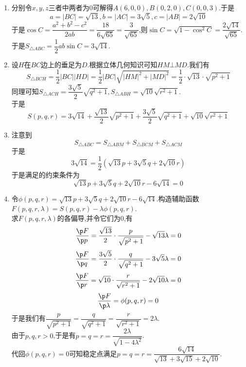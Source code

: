\documentclass{ctexart}
\begin{document}
\begin{solution}
    \begin{enumerate}[label=\textbf{(\arabic*)},leftmargin=*]
        \item 分别令$x,y,z$三者中两者为$0$可解得$A(6,0,0),B(0,2,0),C(0,0,3)$.于是
            $$a=|BC|=\sqrt{13},b=|AC|=3\sqrt{5},c=|AB|=2\sqrt{10}$$
            于是$\cos C=\dfrac{a^2+b^2-c^2}{2ab}=\dfrac{18}{6\sqrt{65}}=\dfrac{3}{\sqrt{65}}$,则$\sin C=\sqrt{1-\cos^2C}=\dfrac{2\sqrt{14}}{\sqrt{65}}$.\\
            于是$S_{\triangle ABC}=\dfrac{1}{2}ab\sin C=3\sqrt{14}$.
        \item 设$H$在$BC$边上的垂足为$D$.根据立体几何知识可知$HM\bot MD$.我们有
            \[S_{\triangle BCH}=\dfrac12|BC||HD|=\dfrac12|BC|\sqrt{|HM|^2+|MD|^2}=\dfrac12\cdot\sqrt{13}\cdot\sqrt{p^2+1}\]
            同理可知$S_{\triangle ACH}=\dfrac{3\sqrt5}{2}\sqrt{q^2+1},S_{\triangle ABH}=\sqrt{10}\sqrt{r^2+1}$.\\
            于是\[S(p,q,r)=3\sqrt{14}+\dfrac{\sqrt{13}}{2}\sqrt{p^2+1}+\dfrac{3\sqrt5}{2}\sqrt{q^2+1}+\sqrt{10}\sqrt{r^2+1}\]
        \item 注意到
            \[S_{\triangle ABC}=S_{\triangle ABM}+S_{\triangle BCM}+S_{\triangle ACM}\]
            于是
            \[3\sqrt{14}=\dfrac12\left(\sqrt{13}p+3\sqrt{5}q+2\sqrt{10}r\right)\]
            于是满足的约束条件为
            \[\sqrt{13}p+3\sqrt{5}q+2\sqrt{10}r-6\sqrt{14}=0\]
        \item 令$\phi(p,q,r)=\sqrt{13}p+3\sqrt{5}q+2\sqrt{10}r-6\sqrt{14}$.构造辅助函数$F(p,q,r,\lambda)=S(p,q,r)-\lambda\phi(p,q,r)$.\\
            求$F(p,q,r,\lambda)$的各偏导,并令它们为$0$,有
            \[\dfrac{\p F}{\p p}=\dfrac{\sqrt{13}}{2}\cdot\dfrac{p}{\sqrt{p^2+1}}-\sqrt{13}\lambda=0\]
            \[\dfrac{\p F}{\p q}=\dfrac{3\sqrt5}{2}\cdot\dfrac{q}{\sqrt{q^2+1}}-3\sqrt{5}\lambda=0\]
            \[\dfrac{\p F}{\p r}=\sqrt{10}\cdot\dfrac{r}{\sqrt{r^2+1}}-2\sqrt{10}\lambda=0\]
            \[\dfrac{\p F}{\p \lambda}=\phi(p,q,r)=0\]
            于是我们有$\dfrac{p}{\sqrt{p^2+1}}=\dfrac{q}{\sqrt{q^2+1}}=\dfrac{r}{\sqrt{r^2+1}}=2\lambda$.\\
            由于$p,q,r>0$,于是有$p=q=r=\dfrac{2\lambda}{\sqrt{1-4\lambda^2}}$.\\
            代回$\phi(p,q,r)=0$可知稳定点满足$p=q=r=\dfrac{6\sqrt{14}}{\sqrt{13}+3\sqrt{15}+2\sqrt{10}}$.
    \end{enumerate}
\end{solution}
\end{document}

